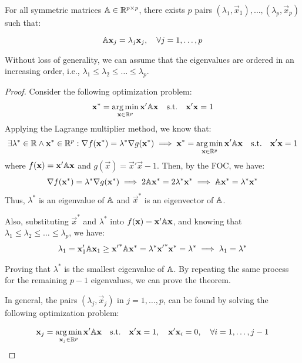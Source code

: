 \begin{theorem}
    For all symmetric matrices $\mathbb{A} \in \mathbb{R}^{p \times p}$, there exists $p$ pairs $(\lambda_1, \Vec{x}_1), \ldots, (\lambda_p, \Vec{x}_p)$ such that:

    \[
        \mathbb{A}\mathbf{x}_j = \lambda_j\mathbf{x}_j, \quad \forall j = 1, \ldots, p 
    \]

    Without loss of generality, we can assume that the eigenvalues are ordered in an increasing order, i.e., $\lambda_1 \leq \lambda_2 \leq \ldots \leq \lambda_p$.
\end{theorem}
\begin{proof}
    Consider the following optimization problem:
    \begin{align*}
        \mathbf{x}^* = \operatorname*{arg\,min}_{\mathbf{x} \in \mathbb{R}^p} \mathbf{x}'\mathbb{A}\mathbf{x} \quad \text{s.t.} \quad \mathbf{x}'\mathbf{x} = 1
    \end{align*}
    Applying the Lagrange multiplier method, we know that: 
    \begin{align*}
        \exists \lambda^* \in \mathbb{R} \land \mathbf{x}^* \in \mathbb{R}^p:
        \nabla f(\mathbf{x}^*) = \lambda^* \nabla g(\mathbf{x}^*)
        \implies
        \mathbf{x}^* = \operatorname*{arg\,min}_{\mathbf{x} \in \mathbb{R}^p} \mathbf{x}'\mathbb{A}\mathbf{x} \quad \text{s.t.} \quad \mathbf{x}'\mathbf{x} = 1
    \end{align*}
    where $f(\mathbf{x}) = \mathbf{x}'\mathbb{A}\mathbf{x}$ and $g(\Vec{x}) = \Vec{x}'\Vec{x} - 1$. Then, by the FOC, we have:
    \begin{align*}
        \nabla f(\mathbf{x}^*) = \lambda^* \nabla g(\mathbf{x}^*)
        \implies
        2\mathbb{A}\mathbf{x}^* = 2\lambda^* \mathbf{x}^*
        \implies
        \mathbb{A}\mathbf{x}^* = \lambda^* \mathbf{x}^*
    \end{align*}
    Thus, $\lambda^*$ is an eigenvalue of $\mathbb{A}$ and $\Vec{x}^*$ is an eigenvector of $\mathbb{A}$.

    Also, substituting $\Vec{x}^*$ and $\lambda^*$ into $f(\mathbf{x}) = \mathbf{x}'\mathbb{A}\mathbf{x}$, and knowing that $\lambda_1 \leq \lambda_2 \leq \ldots \leq \lambda_p$, we have:
    \begin{align*}
        \lambda_1 = \mathbf{x}_1'\mathbb{A}\mathbf{x}_1 \geq \mathbf{x'}^*  \mathbb{A} \mathbf{x}^* = \lambda^* \mathbf{x'}^* \mathbf{x}^* = \lambda^* \implies \lambda_1 = \lambda^*
    \end{align*}

    Proving that $\lambda^*$ is the smallest eigenvalue of $\mathbb{A}$. By repeating the same process for the remaining $p-1$ eigenvalues, we can prove the theorem.

    In general, the pairs $(\lambda_j, \Vec{x}_j)$ in $j = 1, \ldots, p$, can be found by solving the following optimization problem:

    \begin{align*}
        \mathbf{x}_j = \operatorname*{arg\,min}_{\mathbf{x}_j \in \mathbb{R}^p} 
            \mathbf{x}'\mathbb{A}\mathbf{x}
        \quad \text{s.t.} \quad 
        \mathbf{x}'\mathbf{x} = 1, \quad \mathbf{x}'\mathbf{x}_i = 0, \quad \forall i = 1, \ldots, j-1
    \end{align*}
\end{proof}